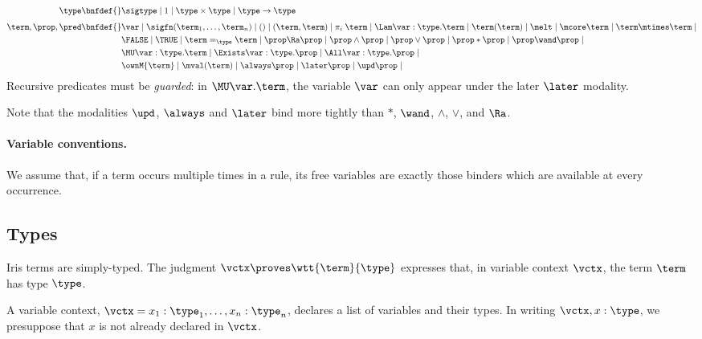\begin{align*}
  \type \bnfdef{}&
      \sigtype \mid
      1 \mid
      \type \times \type \mid
      \type \to \type
\\[0.4em]
  \term, \prop, \pred \bnfdef{}&
      \var \mid
      \sigfn(\term_1, \dots, \term_n) \mid
      () \mid
      (\term, \term) \mid
      \pi_i\; \term \mid
      \Lam \var:\type.\term \mid
      \term(\term)  \mid
      \melt \mid
      \mcore\term \mid
      \term \mtimes \term \mid
\\&
    \FALSE \mid
    \TRUE \mid
    \term =_\type \term \mid
    \prop \Ra \prop \mid
    \prop \land \prop \mid
    \prop \lor \prop \mid
    \prop * \prop \mid
    \prop \wand \prop \mid
\\&
    \MU \var:\type. \term  \mid
    \Exists \var:\type. \prop \mid
    \All \var:\type. \prop \mid
\\&
    \ownM{\term} \mid \mval(\term) \mid
    \always\prop \mid
    {\later\prop} \mid
    \upd \prop\mid
\end{align*}
Recursive predicates must be \emph{guarded}: in $\MU \var. \term$, the variable $\var$ can only appear under the later $\later$ modality.

Note that the modalities $\upd$, $\always$ and $\later$ bind more tightly than $*$, $\wand$, $\land$, $\lor$, and $\Ra$.


\paragraph{Variable conventions.}
We assume that, if a term occurs multiple times in a rule, its free variables are exactly those binders which are available at every occurrence.


\subsection{Types}\label{sec:types}

Iris terms are simply-typed.
The judgment $\vctx \proves \wtt{\term}{\type}$ expresses that, in variable context $\vctx$, the term $\term$ has type $\type$.

A variable context, $\vctx = x_1:\type_1, \dots, x_n:\type_n$, declares a list of variables and their types.
In writing $\vctx, x:\type$, we presuppose that $x$ is not already declared in $\vctx$.

